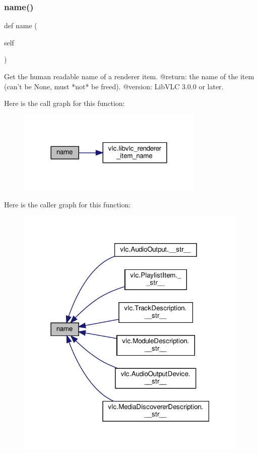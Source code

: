 \subsubsection{\texorpdfstring{name()}{name()}}
{\footnotesize\ttfamily def name (\begin{DoxyParamCaption}\item[{}]{self }\end{DoxyParamCaption})}

\begin{DoxyVerb}Get the human readable name of a renderer item.
@return: the name of the item (can't be None, must *not* be freed).
@version: LibVLC 3.0.0 or later.
\end{DoxyVerb}
 Here is the call graph for this function\+:
\nopagebreak
\begin{figure}[H]
\begin{center}
\leavevmode
\includegraphics[width=252pt]{classvlc_1_1_renderer_a5907ca3bbf8e7cd8f40c3007338f6d02_cgraph}
\end{center}
\end{figure}
Here is the caller graph for this function\+:
\nopagebreak
\begin{figure}[H]
\begin{center}
\leavevmode
\includegraphics[width=315pt]{classvlc_1_1_renderer_a5907ca3bbf8e7cd8f40c3007338f6d02_icgraph}
\end{center}
\end{figure}
\mbox{\label{classvlc_1_1_renderer_a4cd51e19135e5ad4a19eae3ea9c60537}} 
